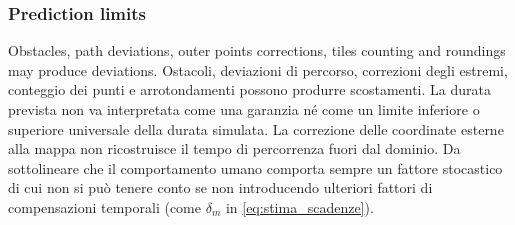 \subsubsection{Prediction limits}
Obstacles, path deviations, outer points corrections, tiles counting and roundings may produce 
deviations.
Ostacoli, deviazioni di percorso, correzioni degli estremi, conteggio dei punti e
arrotondamenti possono produrre scostamenti. La durata prevista non va
interpretata come una garanzia né come un limite inferiore o superiore
universale della durata simulata. La correzione delle coordinate esterne
alla mappa non ricostruisce il tempo di percorrenza fuori dal dominio. Da sottolineare
che il comportamento umano comporta sempre un fattore stocastico di cui non 
si può tenere conto se non introducendo ulteriori fattori di compensazioni temporali (come $\delta_m$ in \ref{eq:stima_scadenze}).




